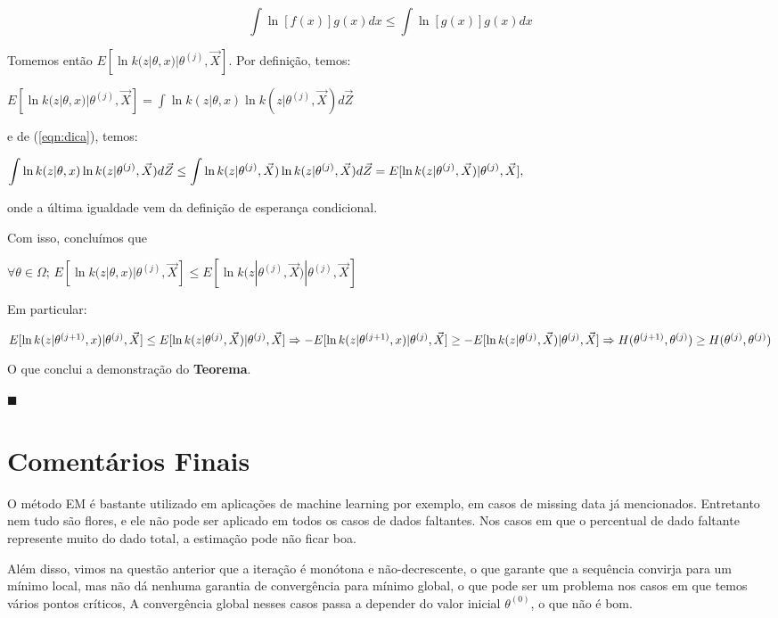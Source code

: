 \documentclass[12pt]{article}
\begin{document}
\begin{equation}
    \label{eqn:dica}
    \int \ln [f(x)]g(x) dx \leq \int \ln [g(x)]g(x)dx
\end{equation}

Tomemos então $E[\ln k(z|\theta,x)|\theta^{(j)},\vec X]$. Por definição, temos:

$E[\ln k(z|\theta,x)|\theta^{(j)},\vec X] = \displaystyle\int \ln k(z|\theta,x) \ln k(z|\theta^{(j)},\vec X)d\vec Z$

e de (\ref{eqn:dica}), temos:

$\displaystyle\int \ln k(z|\theta,x) \ln k(z|\theta^{(j)},\vec X)d\vec Z\\ \leq \displaystyle\int \ln k(z|\theta^{(j)},\vec X) \ln k(z|\theta^{(j)},\vec X)d\vec Z\\ =E[\ln k(z|\theta^{(j)},\vec X)|\theta^{(j)},\vec X],$

onde a última igualdade vem da definição de esperança condicional.

Com isso, concluímos que 

$\forall \theta \in \Omega;\,E[\ln k(z|\theta,x)|\theta^{(j)},\vec X]\leq E[\ln k(z|\theta^{(j)},\vec X)|\theta^{(j)},\vec X]$

Em particular:

$E[\ln k(z|\theta^{(j+1)},x)|\theta^{(j)},\vec X]\leq E[\ln k(z|\theta^{(j)},\vec X)|\theta^{(j)},\vec X]\\
\Rightarrow -E[\ln k(z|\theta^{(j+1)},x)|\theta^{(j)},\vec X]\geq -E[\ln k(z|\theta^{(j)},\vec X)|\theta^{(j)},\vec X]\\
\Rightarrow H(\theta^{(j+1)},\theta^{(j)})\geq H(\theta^{(j)},\theta^{(j)})$

O que conclui a demonstração do \textbf{Teorema}.

$\blacksquare$


\section{Comentários Finais}

O método EM é bastante utilizado em aplicações de machine learning por exemplo, em casos de missing data já mencionados. Entretanto nem tudo são flores, e ele não pode ser aplicado em todos os casos de dados faltantes. Nos casos em que o percentual de dado faltante represente muito do dado total, a estimação pode não ficar boa.

Além disso, vimos na questão anterior que a iteração é monótona e não-decrescente, o que garante que a sequência convirja para um mínimo local, mas não dá nenhuma garantia de convergência para mínimo global, o que pode ser um problema nos casos em que temos vários pontos críticos, A convergência global nesses casos passa a depender do valor inicial $\theta^{(0)}$, o que não é bom.

\newpage



\end{document}
